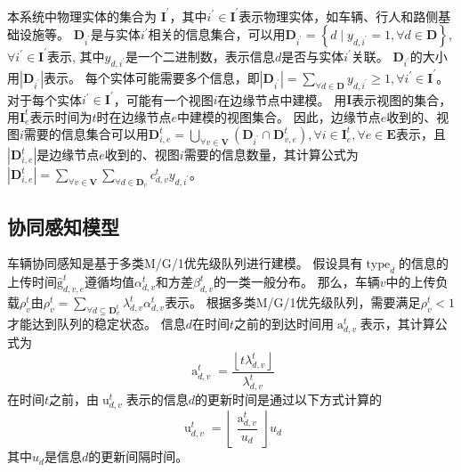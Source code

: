 本系统中物理实体的集合为 $\mathbf{I}^{\prime}$，其中$i^{\prime} \in \mathbf{I}^{\prime}$表示物理实体，如车辆、行人和路侧基础设施等。
$\mathbf{D}_{i^{\prime}}$是与实体$i^{\prime}$相关的信息集合，可以用$\mathbf{D}_{i^{\prime}}=\left\{d \mid y_{d, i^{\prime}} = 1, \forall d \in \mathbf{D} \right\}$, $\forall i^{\prime} \in \mathbf{I}^{\prime}$表示, 其中$y_{d, i^{\prime}}$是一个二进制数，表示信息$d$是否与实体$i^{\prime}$关联。
$\mathbf{D}_{i^{\prime}}$的大小用$|\mathbf{D}_{i^{\prime}}|$表示。
每个实体可能需要多个信息，即$|\mathbf{D}_{i^{\prime}}| = \sum_{\forall d \in \mathbf{D}}y_{d, i^{\prime}} \geq 1, \forall i^{\prime} \in \mathbf{I}^{\prime}$。
对于每个实体$i^{\prime} \in \mathbf{I}^{\prime}$，可能有一个视图$i$在边缘节点中建模。
用$\mathbf{I}$表示视图的集合，用$\mathbf{I}_e^{t}$表示时间为$t$时在边缘节点$e$中建模的视图集合。
因此，边缘节点$e$收到的、视图$i$需要的信息集合可以用$\mathbf{D}_{i, e}^t=\bigcup_{\forall v \in \mathbf{V}}\left(\mathbf{D}_{i^{\prime}} \cap \mathbf{D}_{v, e}^t\right), \forall i \in \mathbf{I}_e^{t}, \forall e \in \mathbf{E}$表示，且 $| \mathbf{D}_{i, e}^t |$是边缘节点$e$收到的、视图$i$需要的信息数量，其计算公式为$| \mathbf{D}_{i, e}^t | =  \sum_{\forall v \in \mathbf{V}} \sum_{\forall d \in \mathbf{D}_v} c_{d, v}^t  y_{d, i^{\prime}}$。

\subsection{协同感知模型}
车辆协同感知是基于多类M/G/1优先级队列\cite{moltafet2020age}进行建模。
假设具有$\operatorname{type}_d$的信息的上传时间$\operatorname{\hat{g}}_{d, v, e}^t$遵循均值$\alpha_{d, v}^t$和方差$\beta_{d, v}^t$的一类一般分布。
那么，车辆$v$中的上传负载$\rho_{v}^{t}$由$ \rho_{v}^{t}=\sum_{\forall d \subseteq \mathbf{D}_v^t} \lambda_{d, v}^{t} \alpha_{d, v}^t$表示。
根据多类M/G/1优先级队列，需要满足$\rho_{v}^{t} < 1$才能达到队列的稳定状态。
信息$d$在时间$t$之前的到达时间用$\operatorname{a}_{d, v}^t$表示，其计算公式为
\begin{equation}
    \operatorname{a}_{d, v}^t =  \frac{\left \lfloor t \lambda_{d, v}^t \right \rfloor }{\lambda_{d, v}^{t}} 
\end{equation}
在时间$t$之前，由$\operatorname{u}_{d, v}^t$表示的信息$d$的更新时间是通过以下方式计算的
\begin{equation}
    \operatorname{u}_{d, v}^t = \left \lfloor  \frac{\operatorname{a}_{d, v}^t}{u_d} \right \rfloor  u_d
\end{equation}
其中$u_d$是信息$d$的更新间隔时间。


